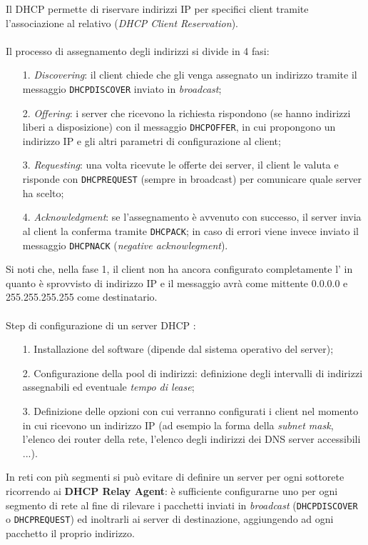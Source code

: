 \documentclass[a4paper, twoside]{article}
\def\code#1{\texttt{#1}}
\def\vedi#1{\nameref{#1}}
\def\italic#1{\textit{#1}}
\begin{document}
Il DHCP permette di riservare indirizzi IP per specifici client tramite l'associazione al relativo \vedi{Indirizzo MAC} (\italic{DHCP Client Reservation}).
\\\\Il processo di assegnamento degli indirizzi si divide in 4 fasi:
\begin{itemize}
	\item[1.] \italic{Discovering}: il client chiede che gli venga assegnato un indirizzo tramite il messaggio \code{DHCPDISCOVER} inviato in \textit{broadcast};
	\item[2.] \italic{Offering}: i server che ricevono la richiesta rispondono (se hanno indirizzi liberi a disposizione) con il messaggio \code{DHCPOFFER}, in cui propongono un indirizzo IP e gli altri parametri di configurazione al client;
	\item[3.] \italic{Requesting}: una volta ricevute le offerte dei server, il client le valuta e risponde con \code{DHCPREQUEST} (sempre in broadcast) per comunicare quale server ha scelto;
	\item[4.] \italic{Acknowledgment}: se l'assegnamento è avvenuto con successo, il server invia al client la conferma tramite \code{DHCPACK}; in caso di errori viene invece inviato il messaggio \code{DHCPNACK} (\italic{negative acknowlegment}).
\end{itemize}
Si noti che, nella fase 1, il client non ha ancora configurato completamente l'\vedi{Internet protocol suite (TCP/IP)} in quanto è sprovvisto di indirizzo IP e il messaggio avrà come mittente 0.0.0.0 e 255.255.255.255 come destinatario.
\\\\Step di configurazione di un server DHCP :
\begin{itemize}
	\item[1.] Installazione del software (dipende dal sistema operativo del server);
	\item[2.] Configurazione della pool di indirizzi: definizione degli intervalli di indirizzi assegnabili ed eventuale \italic{tempo di lease};
	\item[3.] Definizione delle opzioni con cui verranno configurati i client nel momento in cui ricevono un indirizzo IP (ad esempio la forma della \italic{subnet mask}, l'elenco dei router della rete, l'elenco degli indirizzi dei DNS server accessibili ...).
\end{itemize}
In reti con più segmenti si può evitare di definire un server per ogni sottorete ricorrendo ai \textbf{DHCP Relay Agent}: è sufficiente configurarne uno per ogni segmento di rete al fine di rilevare i pacchetti inviati in \italic{broadcast} (\code{DHCPDISCOVER} o \code{DHCPREQUEST}) ed inoltrarli ai server di destinazione, aggiungendo ad ogni pacchetto il proprio indirizzo.\\
\end{document}
